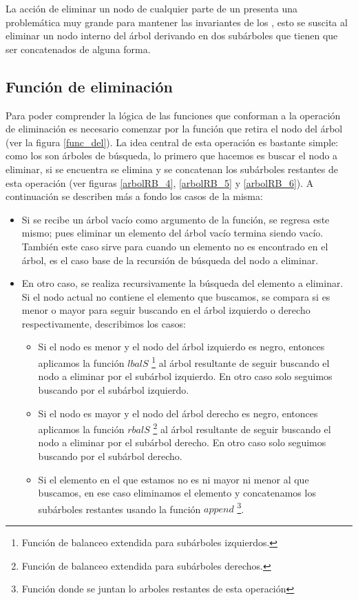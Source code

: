 La acci\'on de eliminar un nodo de cualquier parte de un {\arn} presenta una problemática muy grande 
para mantener las invariantes de los {\arns}, esto se suscita al eliminar un nodo interno del 
\'arbol derivando en dos subárboles que tienen que ser concatenados de alguna forma.

\subsection{Funci\'on de eliminaci\'on}

Para poder comprender la l\'ogica de las funciones que conforman a la operaci\'on de eliminaci\'on
es necesario comenzar por la funci\'on que retira el nodo del \'arbol (ver la figura \ref{func_del}).
La idea central de esta operaci\'on es bastante simple: como los {\arns} son \'arboles de búsqueda,
lo primero que hacemos es buscar el nodo a eliminar, si se encuentra se elimina y se concatenan los
subárboles restantes de esta operaci\'on (ver figuras \ref{arbolRB_4}, \ref{arbolRB_5} y
\ref{arbolRB_6}). A continuaci\'on se describen m\'as a fondo los casos de la misma:

\begin{itemize}
    \item Si se recibe un \'arbol vacío como argumento de la funci\'on, se regresa este mismo; pues
    eliminar un elemento del \'arbol vacío termina siendo vacío. También este caso sirve para
    cuando un elemento no es encontrado en el \'arbol, es el caso base de la recursi\'on de
    búsqueda del nodo a eliminar.
    \item En otro caso, se realiza recursivamente la búsqueda del elemento a eliminar. Si el nodo
    actual no contiene el elemento que buscamos, se compara si es menor o mayor para seguir
    buscando en el \'arbol izquierdo o derecho respectivamente, describimos los casos:
    \begin{itemize}
        \item Si el nodo es menor y el nodo del \'arbol izquierdo es negro, entonces aplicamos la 
        funci\'on \hyperref[lbalS]{$lbalS$} \footnote{Funci\'on de balanceo extendida para 
        subárboles izquierdos.} al \'arbol resultante de seguir buscando el nodo a eliminar por el 
        subárbol izquierdo. 
        En otro caso solo seguimos buscando por el subárbol izquierdo.
        \item Si el nodo es mayor y el nodo del \'arbol derecho es negro, entonces aplicamos la 
        funci\'on \hyperref[lbalS]{$rbalS$} \footnote{Funci\'on de balanceo extendida para 
        subárboles derechos.} al \'arbol resultante de seguir buscando el nodo a eliminar por el 
        subárbol derecho. 
        En otro caso solo seguimos buscando por el subárbol derecho.
        \item Si el elemento en el que estamos no es ni mayor ni menor al que buscamos, en ese
        caso eliminamos el elemento y concatenamos los subárboles restantes usando la función 
        \hyperref[func_app]{$append$} \footnote{Funci\'on donde se juntan lo arboles restantes de 
        esta operaci\'on}.
    \end{itemize}
    
\end{itemize}

